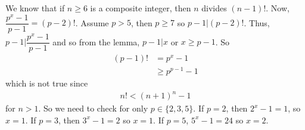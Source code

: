 	\begin{solution}
		We know that if $n\geq 6$ is a composite integer, then $n$ divides $(n-1)!$. Now, $\dfrac{p^x-1}{p-1}=(p-2)!$. Assume $p>5$, then $p\geq7$ so $p-1|(p-2)!$. Thus, $p-1 \big| \dfrac{p^x-1}{p-1}$ and so from the lemma, $p-1|x$ or $x\geq p-1$. So
			\begin{align*}
				(p-1)!
					& =  p^x-1\\
					& \geq p^{p-1}-1
			\end{align*}
		which is not true since
			\begin{align*}
				n!  < (n+1)^n-1
			\end{align*}
		for $n>1$. So we need to check for only $p\in\{2,3,5\}$. If $p=2$, then $2^x-1=1$, so $x=1$. If $p=3$, then $3^x-1=2$ so $x=1$. If $p=5$, $5^x-1=24$ so $x=2$.
	\end{solution}

